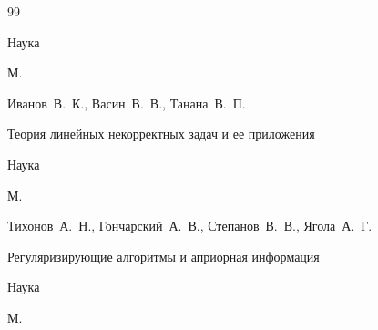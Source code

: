 \begin{thebibliography}{99}

\publ Наука

\publaddr М.













\by Иванов~В.~К., Васин~В.~В., Танана~В.~П. 

\book Теория линейных некорректных задач и ее приложения


\publ Наука

\publaddr М.












\by Тихонов~А.~Н., Гончарский~А.~В., Степанов~В.~В., Ягола~А.~Г.

\book Регуляризирующие алгоритмы и априорная информация


\publ Наука

\publaddr М.







\end{thebibliography}
